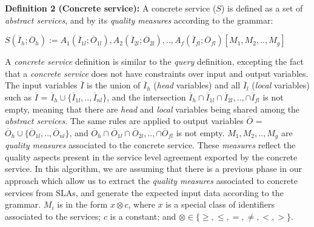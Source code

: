 \noindent \textbf{Definition 2 (Concrete service):} A concrete service ($S$) is defined as a set of 
\textit{abstract services}, and by its \textit{quality measures} according to the grammar:

\begin{center}

\begin{math}
S (\overline{I}_{h}; \overline{O}_{h}) := A_{1}(\overline{I}_{1l}; \overline{O}_{1l}), A_{2}(\overline{I}_{2l}; \overline{O}_{2l}), ..,  A_{f}(\overline{I}_{fl}; \overline{O}_{fl})[M_{1},M_{2}, ..,M_{g}]
\end{math}

\end{center} 

A \textit{concrete service} definition is similar to the \textit{query} definition, excepting the fact that a \textit{concrete service} does not have constraints over input and output variables.
The input variables $\overline{I}$ is the union of $\overline{I}_{h}$ (\textit{head} variables) and all $\overline{I}_{l}$ (\textit{local} variables) such as  
$\overline{I}$ =  $\overline{I}_{h} \cup \lbrace\overline{I}_{1l},..,\overline{I}_{nl}\rbrace$, and
the intersection $\overline{I}_{h} \cap \overline{I}_{1l} \cap \overline{I}_{2l},.., \cap \overline{I}_{fl}$ is not empty, meaning that there are \textit{head} and \textit{local }variables being shared among the \textit{abstract services}. 
The same rules are applied to output variables $\overline{O}$ = $\overline{O}_{h} \cup \lbrace\overline{O}_{1l},..,\overline{O}_{nl}\rbrace$, and $\overline{O}_{h} \cap \overline{O}_{1l} \cap \overline{O}_{2l},.., \cap  \overline{O}_{fl}$ is not empty.
%
$M_{1},M_{2}, .., M_{g}$ are \textit{quality measures} associated to the concrete service. 
These \textit{measures} reflect the quality aspects present in the service level agreement exported by the concrete service. 
%
In this algorithm, we are assuming that there is a previous phase in our approach which allow us to extract the \textit{quality measures} associated to concrete services from SLAs, and generate the expected input data according to the grammar.
%
$M_{i}$ is in the form $x \otimes c$, where $x$ is a special class of identifiers associated to the services; $c$ is a constant; and $\otimes \in\lbrace \geq, \leq, =, \neq, <, >\rbrace$.
 
